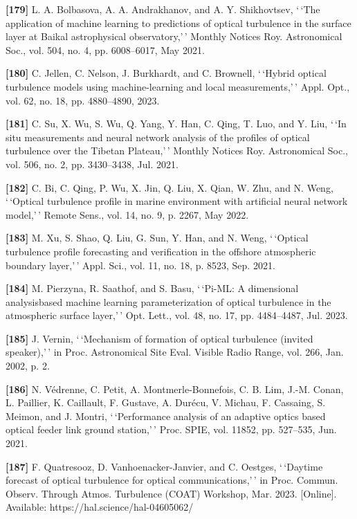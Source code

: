 \documentclass[
]{article}
\begin{document}
\textbf{{[}179{]}} L. A. Bolbasova, A. A. Andrakhanov, and A. Y.
Shikhovtsev, `\,`The application of machine learning to predictions of
optical turbulence in the surface layer at Baikal astrophysical
observatory,'\,' Monthly Notices Roy. Astronomical Soc., vol. 504, no.
4, pp. 6008--6017, May 2021.

\textbf{{[}180{]}} C. Jellen, C. Nelson, J. Burkhardt, and C. Brownell,
`\,`Hybrid optical turbulence models using machine-learning and local
measurements,'\,' Appl. Opt., vol. 62, no. 18, pp. 4880--4890, 2023.

\textbf{{[}181{]}} C. Su, X. Wu, S. Wu, Q. Yang, Y. Han, C. Qing, T.
Luo, and Y. Liu, `\,`In situ measurements and neural network analysis of
the profiles of optical turbulence over the Tibetan Plateau,'\,' Monthly
Notices Roy. Astronomical Soc., vol. 506, no. 2, pp. 3430--3438, Jul.
2021.

\textbf{{[}182{]}} C. Bi, C. Qing, P. Wu, X. Jin, Q. Liu, X. Qian, W.
Zhu, and N. Weng, `\,`Optical turbulence profile in marine environment
with artificial neural network model,'\,' Remote Sens., vol. 14, no. 9,
p. 2267, May 2022.

\textbf{{[}183{]}} M. Xu, S. Shao, Q. Liu, G. Sun, Y. Han, and N. Weng,
`\,`Optical turbulence profile forecasting and verification in the
offshore atmospheric boundary layer,'\,' Appl. Sci., vol. 11, no. 18, p.
8523, Sep. 2021.

\textbf{{[}184{]}} M. Pierzyna, R. Saathof, and S. Basu, `\,`Pi-ML: A
dimensional analysisbased machine learning parameterization of optical
turbulence in the atmospheric surface layer,'\,' Opt. Lett., vol. 48,
no. 17, pp. 4484--4487, Jul. 2023.

\textbf{{[}185{]}} J. Vernin, `\,`Mechanism of formation of optical
turbulence (invited speaker),'\,' in Proc. Astronomical Site Eval.
Visible Radio Range, vol. 266, Jan. 2002, p. 2.

\textbf{{[}186{]}} N. Védrenne, C. Petit, A. Montmerle-Bonnefois, C. B.
Lim, J.-M. Conan, L. Paillier, K. Caillault, F. Gustave, A. Durécu, V.
Michau, F. Cassaing, S. Meimon, and J. Montri, `\,`Performance analysis
of an adaptive optics based optical feeder link ground station,'\,'
Proc. SPIE, vol. 11852, pp. 527--535, Jun. 2021.

\textbf{{[}187{]}} F. Quatresooz, D. Vanhoenacker-Janvier, and C.
Oestges, `\,`Daytime forecast of optical turbulence for optical
communications,'\,' in Proc. Commun. Observ. Through Atmos. Turbulence
(COAT) Workshop, Mar. 2023. {[}Online{]}. Available:
https://hal.science/hal-04605062/
\end{document}
